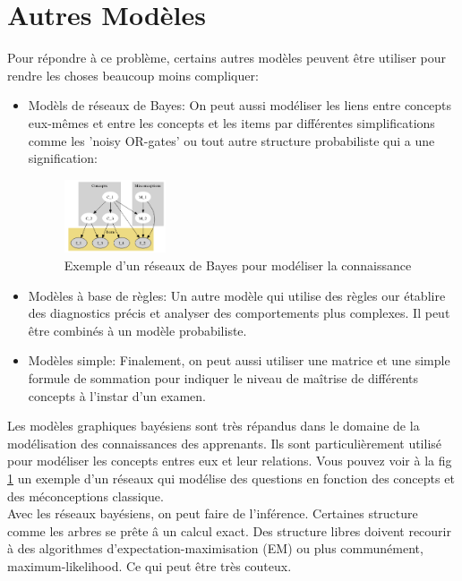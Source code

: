 \documentclass[oneside]{book}
\begin{document}
\section{Autres Modèles}
Pour répondre à ce problème, certains autres modèles peuvent être utiliser pour rendre les choses beaucoup moins compliquer:\\

\begin{itemize}
\item Modèls de réseaux de Bayes: On peut aussi modéliser les liens entre concepts eux-mêmes et entre les concepts et les items par différentes simplifications comme les 'noisy OR-gates' ou tout autre structure probabiliste qui a une signification:
\begin{figure}[!ht]
\centering
\includegraphics[width = 3cm]{bayes_network_knowledge.png}
\caption{Exemple d'un réseaux de Bayes pour modéliser la connaissance}
\label{fig:bayes_knowledge}
\end{figure}

\item Modèles à base de règles: Un autre modèle qui utilise des règles our établire des diagnostics précis et analyser des comportements plus complexes. Il peut être combinés à un modèle probabiliste.
\item Modèles simple: Finalement, on peut aussi utiliser une matrice et une simple formule de sommation pour indiquer le niveau de maîtrise de différents concepts à l'instar d'un examen.
\end{itemize}

Les modèles graphiques bayésiens sont très répandus dans le domaine de la modélisation des connaissances des apprenants. Ils sont particulièrement utilisé pour modéliser les concepts entres eux et leur relations. Vous pouvez voir à la fig \ref{fig:bayes_knowledge} un exemple d'un réseaux qui modélise des questions en fonction des concepts et des méconceptions classique.\\

Avec les réseaux bayésiens, on peut faire de l'inférence. Certaines structure comme les arbres se prête â un calcul exact. Des structure libres doivent recourir à des algorithmes d'expectation-maximisation (EM) ou plus communément, maximum-likelihood. Ce qui peut être très couteux.\\
\end{document}
